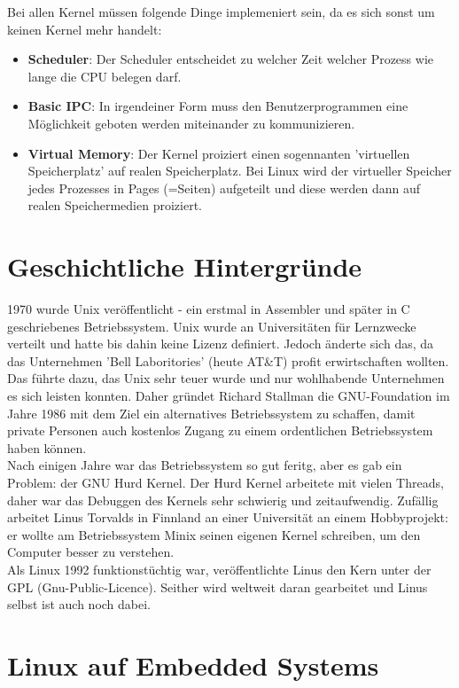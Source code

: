\documentclass[a4paper]{article}
\begin{document}
Bei allen Kernel müssen folgende Dinge implemeniert sein, da es sich sonst um keinen Kernel mehr handelt:

\begin{itemize}
\item \textbf{Scheduler}: Der Scheduler entscheidet zu welcher Zeit welcher Prozess wie lange die CPU belegen darf.
\item \textbf{Basic IPC}: In irgendeiner Form muss den Benutzerprogrammen eine Möglichkeit geboten werden miteinander zu kommunizieren.
\item \textbf{Virtual Memory}: Der Kernel proiziert einen sogennanten 'virtuellen Speicherplatz' auf realen Speicherplatz. Bei Linux wird der virtueller Speicher jedes Prozesses in Pages (=Seiten) aufgeteilt und diese werden dann auf realen Speichermedien proiziert.
\end{itemize}

\section{Geschichtliche Hintergründe}

1970 wurde Unix veröffentlicht - ein erstmal in Assembler und später in C geschriebenes Betriebssystem. Unix wurde an Universitäten für Lernzwecke verteilt und hatte bis dahin keine Lizenz definiert. Jedoch änderte sich das, da das Unternehmen 'Bell Laboritories' (heute AT\&T) profit erwirtschaften wollten. Das führte dazu, das Unix sehr teuer wurde und nur wohlhabende Unternehmen es sich leisten konnten. Daher gründet Richard Stallman die GNU-Foundation im Jahre 1986 mit dem Ziel ein alternatives Betriebssystem zu schaffen, damit private Personen auch kostenlos Zugang zu einem ordentlichen Betriebssystem haben können.\\
Nach einigen Jahre war das Betriebssystem so gut feritg, aber es gab ein Problem: der GNU Hurd Kernel. Der Hurd Kernel arbeitete mit vielen Threads, daher war das Debuggen des Kernels sehr schwierig und zeitaufwendig. Zufällig arbeitet Linus Torvalds in Finnland an einer Universität an einem Hobbyprojekt: er wollte am Betriebssystem Minix seinen eigenen Kernel schreiben, um den Computer besser zu verstehen.\\
Als Linux 1992 funktionstüchtig war, veröffentlichte Linus den Kern unter der GPL (Gnu-Public-Licence). Seither wird weltweit daran gearbeitet und Linus selbst ist auch noch dabei.\\

\section{Linux auf Embedded Systems}
\end{document}
